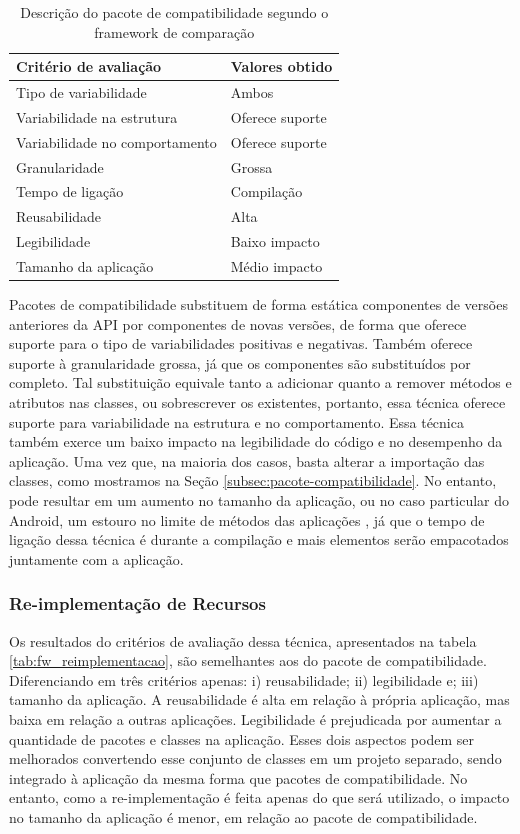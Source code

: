 \begin{table}[!htbp]
  \centering	
  \caption{Descrição do pacote de compatibilidade segundo o framework de comparação}
  \label{tab:fw_pacote}
  \begin{tabular}{ | l | l |}
    \hline
    \textbf{Critério de avaliação} 	& \textbf{Valores obtido}  \\ \hline
    Tipo de variabilidade 			& Ambos  \\ \hline
    Variabilidade na estrutura 		& Oferece suporte \\ \hline
    Variabilidade no comportamento 	& Oferece suporte \\ \hline
    Granularidade 					& Grossa \\ \hline
    Tempo de ligação 				& Compilação \\ \hline
    Reusabilidade 					& Alta \\ \hline
    Legibilidade 					& Baixo impacto \\ \hline
    Tamanho da aplicação 			& Médio impacto \\ \hline
  \end{tabular}
\end{table}

Pacotes de compatibilidade substituem de forma estática componentes de versões
anteriores da API por componentes de novas versões, de forma que oferece suporte
para o tipo de variabilidades positivas e negativas. Também oferece suporte à
granularidade grossa, já que os componentes são substituídos por completo. Tal
substituição equivale tanto a adicionar quanto a remover métodos e atributos nas
classes, ou sobrescrever os existentes, portanto, essa técnica oferece suporte para
variabilidade na estrutura e no comportamento. Essa técnica também exerce um baixo
impacto na legibilidade do código e no desempenho da aplicação. Uma vez que, na maioria
dos casos, basta alterar a importação das classes, como mostramos  na Seção \ref{subsec:pacote-compatibilidade}.
No entanto, pode resultar em um aumento no tamanho
da aplicação, ou no caso particular do Android, um estouro no limite de métodos das
aplicações \cite{Estouro}, já que o tempo de ligação dessa técnica é durante a compilação
e mais elementos serão empacotados juntamente com a aplicação.

\subsubsection{Re-implementação de Recursos}
Os resultados do critérios de avaliação dessa técnica, apresentados na tabela
\ref{tab:fw_reimplementacao}, são semelhantes aos do pacote de compatibilidade.
Diferenciando em três critérios apenas: i) reusabilidade; ii) legibilidade e;
iii) tamanho da aplicação. A reusabilidade é alta em relação à própria aplicação,
mas baixa em relação a outras aplicações. Legibilidade é prejudicada por aumentar
a quantidade de pacotes e classes na aplicação. Esses dois aspectos podem ser
melhorados convertendo esse conjunto de classes em um projeto separado, sendo
integrado à aplicação da mesma forma que pacotes de compatibilidade. No entanto,
como a re-implementação é feita apenas do que será utilizado, o impacto no tamanho
da aplicação é menor, em relação ao pacote de compatibilidade. 

